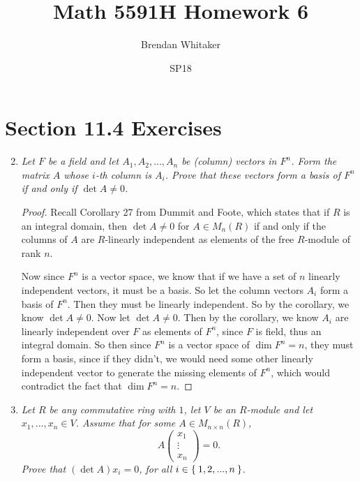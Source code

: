 \documentclass[10pt,oneside,reqno]{amsart}
\theoremstyle{plain}
\theoremstyle{definition}
\theoremstyle{remark}
\newcommand{\lpar}{\left(}
\newcommand{\rpar}{\right)}
\begin{document}
\title{Math 5591H Homework 6}

\date{SP18}

\author[Brendan Whitaker]{Brendan Whitaker}

\maketitle



\section*{Section 11.4 Exercises}



\begin{enumerate}[label=\arabic*.]
\setcounter{enumi}{1}
\item \textit{Let $F$ be a field and let $A_1,A_2,...,A_n$ be (column) vectors in $F^n$. Form the matrix $A$ whose $i$-th column is $A_i$. Prove that these vectors form a basis of $F^n$ if and only if $\det A \neq 0$. }

\begin{proof}
Recall Corollary 27 from Dummit and Foote, which states that if $R$ is an integral domain, then $\det A \neq 0$ for $A \in M_n(R)$ if and only if the columns of $A$ are $R$-linearly independent as elements of the free $R$-module of rank $n$. 


Now since $F^n$ is a vector space, we know that if we have a set of $n$ linearly independent vectors, it must be a basis. So let the column vectors $A_i$ form a basis of $F^n$. Then they must be linearly independent. So by the corollary, we know $\det A \neq 0$. Now let $\det A \neq 0$. Then by the corollary, we know $A_i$ are linearly independent over $F$ as elements of $F^n$, since $F$ is field, thus an integral domain. So then since $F^n$ is a vector space of $\dim F^n = n$, they must form a basis, since if they didn't, we would need some other linearly independent vector to generate the missing elements of $F^n$, which would contradict the fact that $\dim F^n = n$. 
\end{proof}

\item \textit{Let $R$ be any commutative ring with $1$, let $V$ be an $R$-module and let $x_1,...,x_n \in V$. Assume that for some $A \in M_{n \times n}(R)$,
$$
A\lpar 
\begin{matrix}
x_1\\
\vdots\\
x_n
\end{matrix} \rpar  = 0.
$$
Prove that $(\det A)x_i = 0$, for all $i \in \Set{1,2,...,n}$. }


\end{enumerate}
\end{document}
